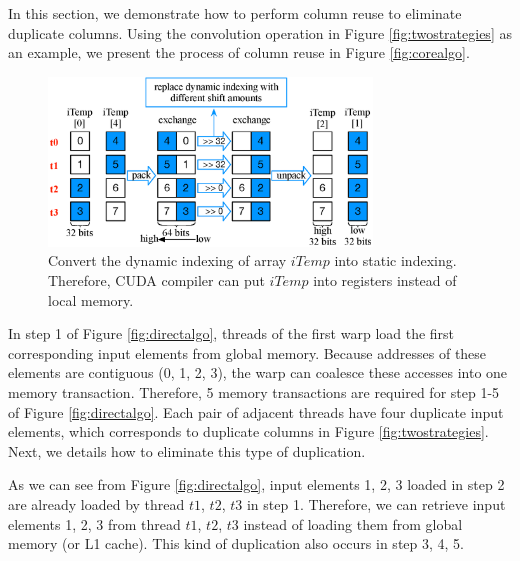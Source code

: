 \documentclass[sigplan,review,anonymous]{acmart}\settopmatter{printfolios=true,printccs=false,printacmref=false}
\begin{document}
In this section, we demonstrate how to perform column reuse to eliminate duplicate columns. Using the convolution operation in Figure \ref{fig:twostrategies} as an example, we present the process of column reuse in Figure \ref{fig:corealgo}.%

\begin{figure}
	\centering
	\includegraphics[width=\columnwidth,height=4.5cm]{./figure/exchange.eps}
\caption{Convert the dynamic indexing of array $iTemp$ into static indexing. Therefore, CUDA compiler can put $iTemp$ into registers instead of local memory.}
\label{fig:exchange}
\end{figure}


In step 1 of Figure \ref{fig:directalgo}, threads of the first warp load the first corresponding input elements from global memory. Because addresses of these elements are contiguous (0, 1, 2, 3), the warp can coalesce these accesses into one memory transaction. Therefore, 5 memory transactions are required for step 1-5 of Figure \ref{fig:directalgo}. Each pair of adjacent threads have four duplicate input elements, which corresponds to duplicate columns in Figure \ref{fig:twostrategies}. Next, we details how to eliminate this type of duplication.

As we can see from Figure \ref{fig:directalgo}, input elements 1, 2, 3 loaded in step 2 are already loaded by thread $t1$, $t2$, $t3$ in step 1. Therefore, we can retrieve input elements 1, 2, 3 from thread $t1$, $t2$, $t3$ instead of loading them from global memory (or L1 cache). This kind of duplication also occurs in step 3, 4, 5.
\end{document}
